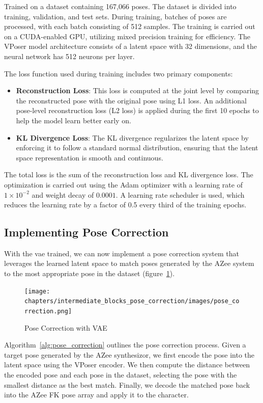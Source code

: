 \documentclass[../../main.tex]{subfiles}
\begin{document}
Trained on a dataset containing 167,066 poses. The dataset is divided into training, validation, and test sets. During training, batches of poses are processed, with each batch consisting of 512 samples. The training is carried out on a CUDA-enabled GPU, utilizing mixed precision training for efficiency. The VPoser model architecture consists of a latent space with 32 dimensions, and the neural network has 512 neurons per layer. 

The loss function used during training includes two primary components: 
\begin{itemize}
    \item \textbf{Reconstruction Loss}: This loss is computed at the joint level by comparing the reconstructed pose with the original pose using L1 loss. An additional pose-level reconstruction loss (L2 loss) is applied during the first 10 epochs to help the model learn better early on.
    \item \textbf{KL Divergence Loss}: The KL divergence regularizes the latent space by enforcing it to follow a standard normal distribution, ensuring that the latent space representation is smooth and continuous.
\end{itemize}

The total loss is the sum of the reconstruction loss and KL divergence loss. The optimization is carried out using the Adam optimizer with a learning rate of $1 \times 10^{-2}$ and weight decay of $0.0001$. A learning rate scheduler is used, which reduces the learning rate by a factor of 0.5 every third of the training epochs. 

\subsection{Implementing Pose Correction}
\label{ch:pose_correction:pose_correction_with_azee:implementation}

With the \gls{vae} trained, we can now implement a pose correction system that leverages the learned latent space to match poses generated by the AZee system to the most appropriate pose in the dataset (figure~\ref{fig:pose_correction}).

\begin{figure}
  \centering \texttt{[image: chapters/intermediate\_blocks\_pose\_correction/images/pose\_correction.png]}
  \caption{Pose Correction with VAE}
  \label{fig:pose_correction}
\end{figure}

Algorithm~\ref{alg:pose_correction} outlines the pose correction process. Given a target pose generated by the AZee synthesizor, we first encode the pose into the latent space using the VPoser encoder. We then compute the distance between the encoded pose and each pose in the dataset, selecting the pose with the smallest distance as the best match. Finally, we decode the matched pose back into the AZee FK pose array and apply it to the character.
\end{document}
